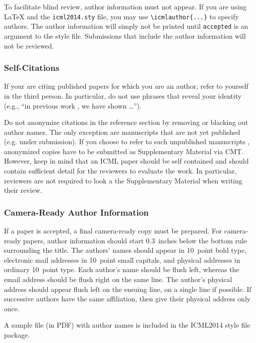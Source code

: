 \documentclass{article}
\begin{document}
To facilitate blind review, author information must not appear.  If
you are using \LaTeX\/ and the \texttt{icml2014.sty} file, you may use
\verb+\icmlauthor{...}+ to specify authors.  The author information
will simply not be printed until {\tt accepted} is an argument to the
style file. Submissions that include the author information will not
be reviewed.

\subsubsection{Self-Citations}

If your are citing published papers for which you are an author, refer
to yourself in the third person. In particular, do not use phrases
that reveal your identity (e.g., ``in previous work \cite{langley00}, we 
have shown \ldots'').

Do not anonymize citations in the reference section by removing or
blacking out author names. The only exception are manuscripts that are
not yet published (e.g. under submission). If you choose to refer to
such unpublished manuscripts \cite{anonymous}, anonymized copies have 
to be submitted
as Supplementary Material via CMT. However, keep in mind that an ICML
paper should be self contained and should contain sufficient detail
for the reviewers to evaluate the work. In particular, reviewers are
not required to look a the Supplementary Material when writing their
review.

\subsubsection{Camera-Ready Author Information}
\label{final author}

If a paper is accepted, a final camera-ready copy must be prepared.
%
For camera-ready papers, author information should start 0.3~inches
below the bottom rule surrounding the title. The authors' names should
appear in 10~point bold type, electronic mail addresses in 10~point
small capitals, and physical addresses in ordinary 10~point type.
Each author's name should be flush left, whereas the email address
should be flush right on the same line. The author's physical address
should appear flush left on the ensuing line, on a single line if
possible. If successive authors have the same affiliation, then give
their physical address only once.

A sample file (in PDF) with author names is included in the ICML2014 
style file package.
\end{document}
